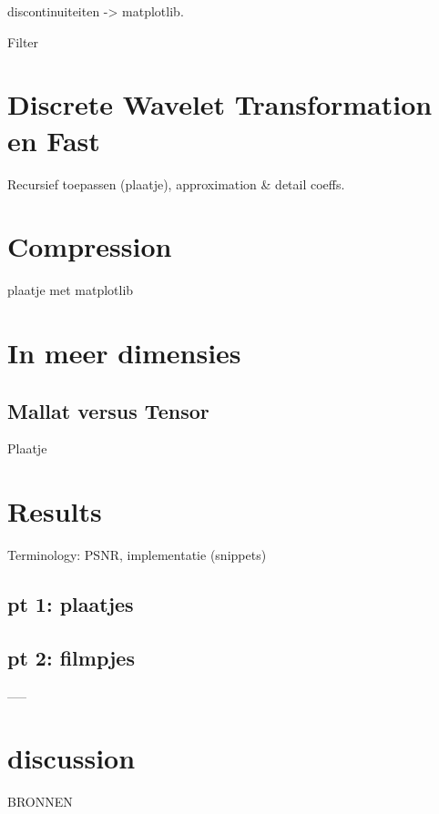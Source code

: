 \documentclass[11pt]{amsart}
\begin{document}
discontinuiteiten -> matplotlib.

Filter

\section{Discrete Wavelet Transformation en Fast}
Recursief toepassen (plaatje), approximation \& detail coeffs.

\section{Compression}
plaatje met matplotlib

\section{In meer dimensies}

\subsection{Mallat versus Tensor}
Plaatje

\section{Results}
Terminology: PSNR, implementatie (snippets)

\subsection{pt 1: plaatjes}
\subsection{pt 2: filmpjes}

-----

\section{discussion}

BRONNEN
\end{document}
